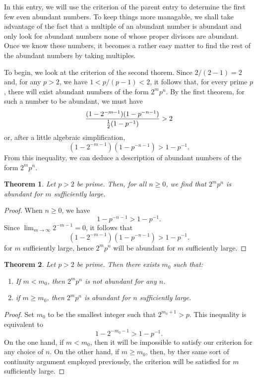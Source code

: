 \documentclass[12pt]{article}
\newtheorem{thm}{Theorem}
\begin{document}
In this entry, we will use the criterion of the parent entry to determine
the first few even abundant numbers.  To keep things more managable, 
we shall take advantage of the fact that a multiple of an abundant number 
is abundant and only look for abundant numbers none of whose proper divisors 
are abundant.  Once we know these numbers, it becomes a rather easy matter
to find the rest of the abundant numbers by taking multiples.

To begin, we look at the criterion of the second thorem.  Since $2 / (2 - 1) = 2$
and, for any $p > 2$, we have $1 < p / (p - 1) < 2$, it follows that, for
every prime $p$, there will exist abundant numbers of the form $2^m p^n$.
By the first theorem, for such a number to be abundant, we must have
\[
{(1 - 2^{-m-1}) (1 - p^{-n-1}) \over \frac{1}{2} (1 - p^{-1})} > 2
\]
or, after a little algebraic simplification,
\[
(1 - 2^{-m-1}) (1 - p^{-n-1}) > 1 - p^{-1}.
\]
From this inequality, we can deduce a description of abundant numbers 
of the form $2^m p^n$.

\begin{thm}
Let $p>2$ be prime.  Then, for all $n \ge 0$, we find that $2^m p^n$ 
is abundant for $m$ sufficiently large.
\end{thm}

\begin{proof}
When $n \ge 0$, we have
\[
1 - p^{-n-1} > 1 - p^{-1}.
\]
Since $\lim_{m \to \infty} 2^{-m-1} = 0$, it follows that 
\[
(1 - 2^{-m-1}) (1 - p^{-n-1}) > 1 - p^{-1}.
\]
for $m$ sufficiently large, hence $2^m p^n$ 
will be abundant for $m$ sufficiently large.
\end{proof}

\begin{thm}
Let $p>2$ be prime.  Then there exists $m_0$ such that:
\begin{enumerate}
\item If $m < m_0$, then $2^m p^n$ is not abundant for any $n$.
\item if $m \ge m_0$, then $2^m p^n$ is abundant for $n$ 
sufficiently large.
\end{enumerate}
\end{thm}

\begin{proof}
Set $m_0$ to be the smallest integer such that $2^{m_0 + 1} > p$.
This inequality is equivalent to
\[
1 - 2^{-m_0 - 1} > 1 - p^{-1}.
\]
On the one hand, if $m < m_0$, then it will be impossible to satisfy 
our criterion for any choice of $n$.  On the other hand, if $m \ge m_0$,
then, by ther same sort of continuity argument employed previously, 
the criterion will be satisfied for $m$ sufficiently large.
\end{proof}
\end{document}
